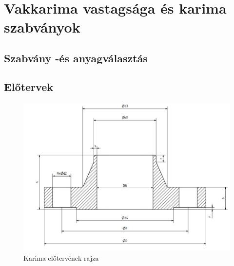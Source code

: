 \section{Vakkarima vastagsága és karima szabványok}

\subsection{Szabvány -és anyagválasztás}

\newpage
\subsection{Előtervek}
\begin{figure}[hbt!]
	\centering
	\includegraphics[scale=.61]{./images/karima.png}
	\caption{Karima előtervének rajza}
\end{figure}

